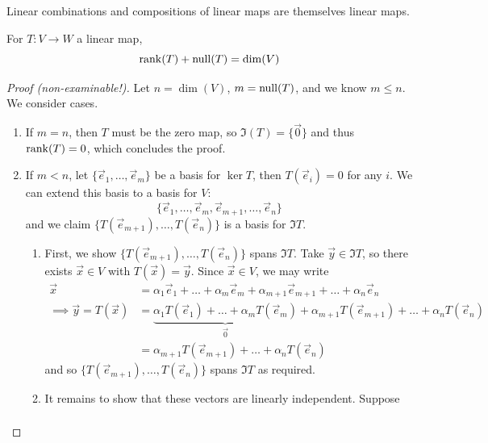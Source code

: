 \documentclass{../template/note}
\begin{document}
    \begin{proposition}
        Linear combinations and compositions of linear maps are themselves linear maps.
    \end{proposition}
    
    \begin{theorem}
        For \(T: V \to W\) a linear map,
        \[
            \operatorname{rank}(T) + \operatorname{null}(T) = \dim(V)
        \]
    \end{theorem}
    
    \begin{proof}[Proof (non-examinable!)]
        Let \(n = \dim(V)\), \(m = \operatorname{null}(T)\), and we know \(m \leq n\). We consider cases.
        \begin{enumerate}
            \item If \(m = n\), then \(T\) must be the zero map, so \(\Im(T) = \{\vec 0\}\) and thus \(\operatorname{rank}(T) = 0\), which concludes the proof.
            \item If \(m < n\), let \(\{\vec e_1, \dots, \vec e_m\}\) be a basis for \(\ker T\), then \(T(\vec e_i) = 0\) for any \(i\). We can extend this basis to a basis for \(V\):
            \[
                \{\vec e_1, \dots, \vec e_m, \vec e_{m+1}, \dots, \vec e_n\}
            \]
            and we claim \(\{T(\vec e_{m+1}), \dots, T(\vec e_n)\}\) is a basis for \(\Im T\).
            \begin{enumerate}
                \item First, we show \(\{T(\vec e_{m+1}), \dots, T(\vec e_n)\}\) spans \(\Im T\). Take \(\vec y \in \Im T\), so there exists \(\vec x \in V\) with \(T(\vec x) = \vec y\). Since \(\vec x \in V\), we may write
                \begin{align*}
                    \vec x &= \alpha_1 \vec e_1 + \dots + \alpha_m \vec e_m + \alpha_{m+1} \vec e_{m+1 }+ \dots + \alpha_n \vec e_n \\
                    \implies \vec y = T(\vec x) &= \underbrace{\alpha_1 T(\vec e_1) + \dots + \alpha_m T(\vec e_m)}_{\vec 0} + \alpha_{m+1} T(\vec e_{m+1})+ \dots + \alpha_n T(\vec e_n) \\
                    &= \alpha_{m+1} T(\vec e_{m+1})+ \dots + \alpha_n T(\vec e_n)
                \end{align*}
                and so \(\{T(\vec e_{m+1}), \dots, T(\vec e_n)\}\) spans \(\Im T\) as required.
                \item It remains to show that these vectors are linearly independent. Suppose
                \begin{align*}

\end{align*}
\end{enumerate}
\end{enumerate}
\end{proof}
\end{document}
